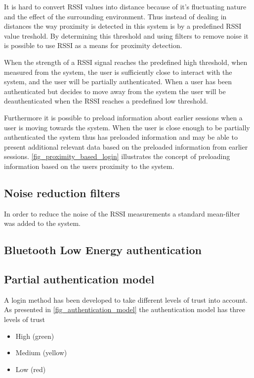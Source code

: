 It is hard to convert RSSI values into distance because of it's fluctuating nature and the effect of the surrounding environment. Thus instead of dealing in distances the way proximity is detected in this system is by a predefined RSSI value treshold. By determining this threshold and using filters to remove noise it is possible to use RSSI as a means for proximity detection.

When the strength of a RSSI signal reaches the predefined high threshold, when measured from the system, the user is sufficiently close to interact with the system, and the user will be partially authenticated.
When a user has been authenticated but decides to move away from the system the user will be deauthenticated when the RSSI reaches a predefined low threshold.

Furthermore it is possible to preload information about earlier sessions when a user is moving towards the system.
When the user is close enough to be partially authenticated the system thus has preloaded information and may be able to present additional relevant data based on the preloaded information from earlier sessions. 
\cref{fig_proximity_based_login} illustrates the concept of preloading information based on the users proximity to the system.

\subsection{Noise reduction filters}
In order to reduce the noise of the RSSI measurements a standard mean-filter was added to the system.

\subsection{Bluetooth Low Energy authentication}

\subsection{Partial authentication model}
A login method has been developed to take different levels of trust into account.
As presented in \cref{fig_authentication_model} the authentication model has three levels of trust
\begin{itemize}
\item High (green)
\item Medium (yellow)
\item Low (red)
\end{itemize}

